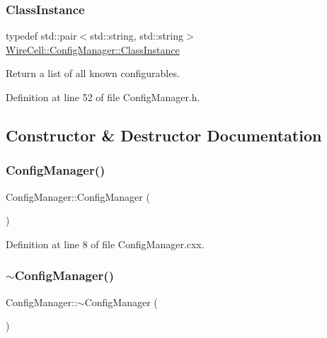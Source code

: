 \subsubsection{\texorpdfstring{Class\+Instance}{ClassInstance}}
{\footnotesize\ttfamily typedef std\+::pair$<$std\+::string, std\+::string$>$ \hyperlink{class_wire_cell_1_1_config_manager_adffbbcadcf6c79655c6809b9155184cb}{Wire\+Cell\+::\+Config\+Manager\+::\+Class\+Instance}}



Return a list of all known configurables. 



Definition at line 52 of file Config\+Manager.\+h.



\subsection{Constructor \& Destructor Documentation}
\mbox{\label{class_wire_cell_1_1_config_manager_a7d3d7c10423d969f7544509f6fcca32f}} 
\subsubsection{\texorpdfstring{Config\+Manager()}{ConfigManager()}}
{\footnotesize\ttfamily Config\+Manager\+::\+Config\+Manager (\begin{DoxyParamCaption}{ }\end{DoxyParamCaption})}



Definition at line 8 of file Config\+Manager.\+cxx.

\mbox{\label{class_wire_cell_1_1_config_manager_a7fa65fdff98bdd5bbbf72196bd9ccf17}} 
\subsubsection{\texorpdfstring{$\sim$\+Config\+Manager()}{~ConfigManager()}}
{\footnotesize\ttfamily Config\+Manager\+::$\sim$\+Config\+Manager (\begin{DoxyParamCaption}{ }\end{DoxyParamCaption})}



